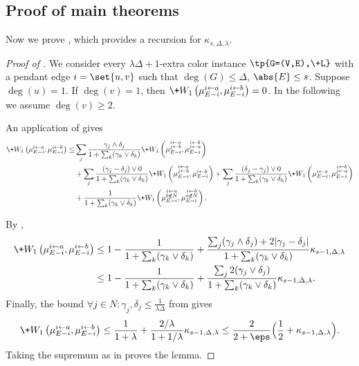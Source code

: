 \documentclass[a4paper,11pt]{article}
\newcommand{\W}[1]{\+W_1\left(#1\right)}
\begin{document}
\subsection{Proof of main theorems}\label{sec:CI-proof}

Now we prove , which provides a recursion for $\kappa_{s,\Delta,\lambda}$.

\begin{proof}[Proof of ]
    We consider every $\lambda\Delta+1$-extra color instance $\tp{G=(V,E),\+L}$ with a pendant edge $i=\set{u,v}$ such that $\deg(G)\le \Delta$, $\abs{E}\le s$. Suppose $\deg(u)=1$. If $\deg(v)=1$, then $\W{\ma,\mb}=0$. In the following we assume $\deg(v)\ge 2$. 

An application of  gives
\begin{align*}
    \W{\ma, \mb}
      \leq&\sj\frac{\gamma_j\wedge\delta_j}{\zzz}\W{\mab, \mba}
    \\&+\sum_j\frac{(\gamma_j-\delta_j)\vee 0}{\zzz}\W{\mab, \mb}
       +\sum_j\frac{(\delta_j-\gamma_j)\vee 0}{\zzz}\W{\ma, \mba}
    \\&+\frac{1}{\zzz}\W{\man, \mbn}.
\end{align*}

By ,
\begin{align*}
    \W{\ma, \mb}&\le 1-\frac{1}{\zzz} + \frac{\sum_j(\gamma_j\wedge\delta_j) + 2|\gamma_j-\delta_j|}{\zzz}\kappa_{s-1,\Delta,\lambda}
    \\&\le 1-\frac{1}{\zzz} + \frac{\sum_j2(\gamma_j\vee\delta_j)}{\zzz}\kappa_{s-1,\Delta, \lambda}.
\end{align*}
Finally, the bound $\forall j\in N : \gamma_j,\delta_j\le \frac{1}{\lambda\Delta}$ from  gives
\begin{align*}
    \W{\ma, \mb} \le \frac{1}{1+\lambda} + \frac{2/\lambda}{1+1/\lambda}\kappa_{s-1,\Delta, \lambda}
    \le \frac{2}{2+\eps}\Big(\frac12 + \kappa_{s-1,\Delta,\lambda}\Big).
\end{align*}
Taking the supremum as in  proves the lemma.
\end{proof}
\end{document}
